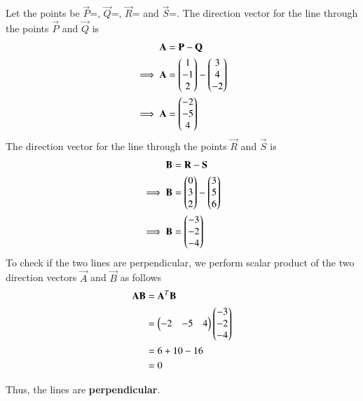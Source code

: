 Let the points be $\vec{P}$=, $\vec{Q}$=, $\vec{R}$= and $\vec{S}$=.
The direction vector for the line through the points $\vec{P}$ and $\vec{Q}$ is
\begin{align}
\mathbf{A} &= \mathbf{P}-\mathbf{Q} \\
\implies\mathbf{A} & = \begin{pmatrix} 1 \\ -1 \\ 2 \end{pmatrix} - \begin{pmatrix} 3 \\ 4 \\ -2\end{pmatrix} \\
\implies\mathbf{A} &= \begin{pmatrix} -2 \\ -5 \\ 4\end{pmatrix}
\end{align}
The direction vector for the line through the points $\vec{R}$ and $\vec{S}$ is
\begin{align}
\mathbf{B} &= \mathbf{R}-\mathbf{S} \\
\implies\mathbf{B} & = \begin{pmatrix} 0 \\ 3 \\ 2 \end{pmatrix} - \begin{pmatrix} 3 \\ 5 \\ 6\end{pmatrix} \\
\implies\mathbf{B} &= \begin{pmatrix} -3 \\ -2 \\ -4\end{pmatrix}\\
\end{align}
To check if the two lines are perpendicular, we perform scalar product of the two direction vectors $\vec{A}$ and $\vec{B}$ as follows
\begin{align}
\mathbf{A}\mathbf{B} &=  \mathbf{A}^T\mathbf{B}\\
&= \begin{pmatrix} -2 & -5 & 4\end{pmatrix}\begin{pmatrix} -3 \\ -2 \\ -4\end{pmatrix}\\
&= 6+10-16\\
&= 0
\end{align}

Thus, the lines are \textbf{perpendicular}. 
